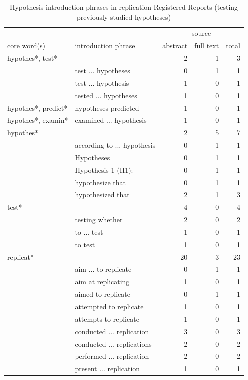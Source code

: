 \documentclass[british,,man,floatsintext]{apa6}
\begin{document}
\begin{table}[tbp]
\begin{center}
\begin{threeparttable}
\caption{\label{tab:unnamed-chunk-10}Hypothesis introduction phrases in replication Registered Reports (testing previously studied hypotheses)}
\footnotesize{
\begin{tabular}{llrrr}
\toprule
 &  & \multicolumn{3}{c}{source} \\
\cmidrule(r){3-5}
core word(s) & introduction phrase & abstract & full text & total\\
\midrule
hypothes*, test* &  & 2 & 1 & 3\\
 & test ... hypotheses & 0 & 1 & 1\\
 & test ... hypothesis & 1 & 0 & 1\\
 & tested ... hypotheses & 1 & 0 & 1\\ \midrule
hypothes*, predict* & hypotheses predicted & 1 & 0 & 1\\ \midrule
hypothes*, examin* & examined ... hypothesis & 1 & 0 & 1\\ \midrule
hypothes* &  & 2 & 5 & 7\\
 & according to ... hypothesis & 0 & 1 & 1\\
 & Hypotheses & 0 & 1 & 1\\
 & Hypothesis 1 (H1): & 0 & 1 & 1\\
 & hypothesize that & 0 & 1 & 1\\
 & hypothesized that & 2 & 1 & 3\\ \midrule
test* &  & 4 & 0 & 4\\
 & testing whether & 2 & 0 & 2\\
 & to ... test & 1 & 0 & 1\\
 & to test & 1 & 0 & 1\\ \midrule
replicat* &  & 20 & 3 & 23\\
 & aim ... to replicate & 0 & 1 & 1\\
 & aim at replicating & 1 & 0 & 1\\
 & aimed to replicate & 0 & 1 & 1\\
 & attempted to replicate & 1 & 0 & 1\\
 & attempts to replicate & 1 & 0 & 1\\
 & conducted ... replication & 3 & 0 & 3\\
 & conducted ... replications & 2 & 0 & 2\\
 & performed ... replication & 2 & 0 & 2\\
 & present ... replication & 1 & 0 & 1\\

\end{tabular}}
\end{threeparttable}
\end{center}
\end{table}
\end{document}
